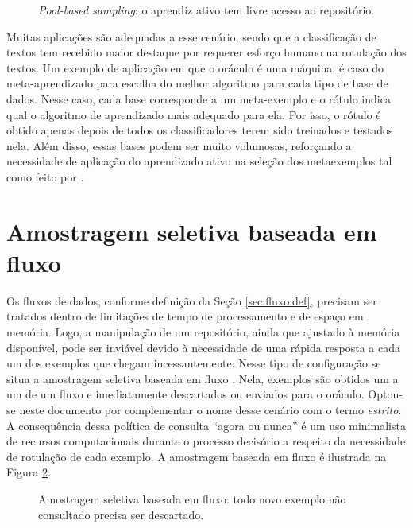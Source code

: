 \begin{figure} %
    \centering
    
    \caption{\textit{Pool-based sampling}: o aprendiz ativo tem livre acesso ao repositório.}
    \label{fig:poolbased}
\end{figure}

Muitas aplicações são adequadas a esse cenário, sendo que a classificação de textos
\citep{mccallum1998employing} tem recebido maior destaque por requerer esforço humano na
rotulação
dos textos.
Um exemplo de aplicação em que o oráculo é uma máquina, é caso do meta-aprendizado para escolha
do
melhor algoritmo para cada tipo de base de dados.
Nesse caso, cada base corresponde a um meta-exemplo e o rótulo indica qual o algoritmo de aprendizado mais
adequado para ela.
Por isso, o rótulo é obtido apenas depois de todos os classificadores terem sido treinados e
testados nela.
Além disso, essas bases podem ser muito volumosas, reforçando a necessidade de aplicação do
aprendizado ativo
na seleção dos metaexemplos tal como feito por \cite{prudencio2007active}.



\section*{Amostragem seletiva baseada em fluxo} \label{sec:cenario_fluxo}
Os fluxos de dados, conforme definição da Seção \ref{sec:fluxo:def}, precisam ser tratados dentro
de limitações de tempo de processamento e de espaço em memória.
Logo, a manipulação de um repositório, ainda que ajustado à memória disponível, pode ser inviável
devido à necessidade de uma rápida resposta a cada um dos exemplos que chegam incessantemente.
Nesse tipo de configuração se situa a amostragem seletiva baseada em fluxo
\citep{cohn1994improving}. %
Nela, exemplos são obtidos um a um de um fluxo e imediatamente descartados ou enviados para o
oráculo.
Optou-se neste documento por complementar o nome desse cenário com o termo \textit{estrito}.
A consequência dessa política de consulta ``agora ou nunca'' é um uso minimalista de recursos
computacionais durante o processo decisório a respeito da necessidade de rotulação de cada
exemplo.
A amostragem baseada em fluxo é ilustrada na Figura \ref{fig:fluxoquery}.

\begin{figure} %
    \centering
    
    \caption{Amostragem seletiva baseada em fluxo: todo novo exemplo não consultado precisa ser
descartado.}
    \label{fig:fluxoquery}
\end{figure}

